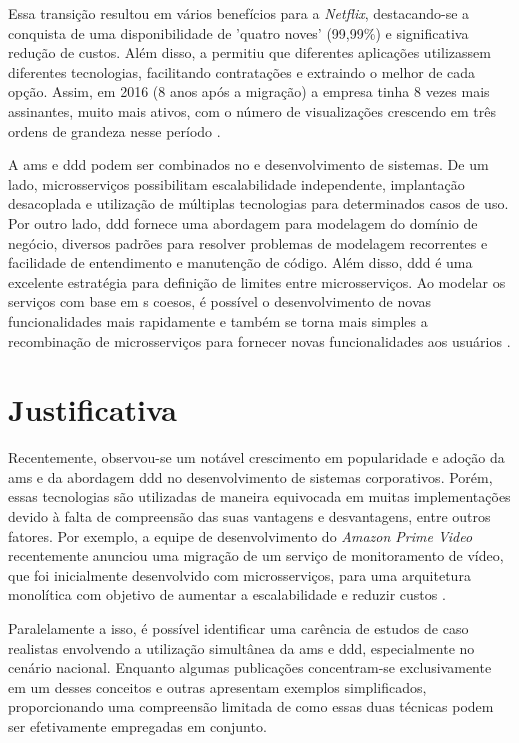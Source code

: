 Essa transição resultou em vários benefícios para a \emph{Netflix}, destacando-se a conquista de uma disponibilidade de 'quatro noves' (99,99\%) e significativa redução de custos. Além disso, a  permitiu que diferentes aplicações utilizassem diferentes tecnologias, facilitando contratações e extraindo o melhor de cada opção. Assim, em 2016 (8 anos após a migração) a empresa tinha 8 vezes mais assinantes, muito mais ativos, com o número de visualizações crescendo em três ordens de grandeza nesse período \cite{netflixMigration}.

A \acrshort{ams} e \acrshort{ddd} podem ser combinados no  e desenvolvimento de sistemas. De um lado, microsserviços possibilitam escalabilidade independente, implantação desacoplada e utilização de múltiplas tecnologias para determinados casos de uso. Por outro lado, \acrshort{ddd} fornece uma abordagem para modelagem do domínio de negócio, diversos padrões para resolver problemas de modelagem recorrentes e facilidade de entendimento e manutenção de código. Além disso, \acrshort{ddd} é uma excelente estratégia para definição de limites entre microsserviços. Ao modelar os serviços com base em s coesos, é possível o desenvolvimento de novas funcionalidades mais rapidamente e também se torna mais simples a recombinação de microsserviços para fornecer novas funcionalidades aos usuários \cite{buildingMicroservices}.

\section{Justificativa}

Recentemente, observou-se um notável crescimento em popularidade e adoção da \acrshort{ams} e da abordagem \acrshort{ddd} no desenvolvimento de sistemas corporativos. Porém, essas tecnologias são utilizadas de maneira equivocada em muitas implementações devido à falta de compreensão das suas vantagens e desvantagens, entre outros fatores. Por exemplo, a equipe de desenvolvimento do \emph{Amazon Prime Video} recentemente anunciou uma migração de um serviço de monitoramento de vídeo, que foi inicialmente desenvolvido com microsserviços, para uma arquitetura monolítica com objetivo de aumentar a escalabilidade e reduzir custos \cite{amazonBackMigration}.

Paralelamente a isso, é possível identificar uma carência de estudos de caso realistas envolvendo a utilização simultânea da \acrshort{ams} e \acrshort{ddd}, especialmente no cenário nacional.  Enquanto algumas publicações concentram-se exclusivamente em um desses conceitos e outras apresentam exemplos simplificados, proporcionando uma compreensão limitada de como essas duas técnicas podem ser efetivamente empregadas em conjunto. 

